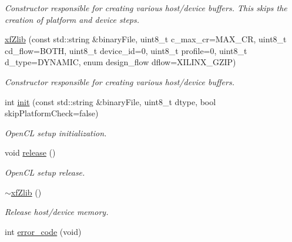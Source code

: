 \begin{DoxyCompactItemize}
\begin{DoxyCompactList}\small\item\em Constructor responsible for creating various host/device buffers. This skips the creation of platform and device steps. \end{DoxyCompactList}\item 
\hypertarget{classxf_1_1compression_1_1xfZlib_a7712b200970e31a07526a43b40661dfe}{\hyperlink{classxf_1_1compression_1_1xfZlib_a7712b200970e31a07526a43b40661dfe}{xf\-Zlib} (const std\-::string \&binary\-File, uint8\-\_\-t c\-\_\-max\-\_\-cr=M\-A\-X\-\_\-\-C\-R, uint8\-\_\-t cd\-\_\-flow=B\-O\-T\-H, uint8\-\_\-t device\-\_\-id=0, uint8\-\_\-t profile=0, uint8\-\_\-t d\-\_\-type=D\-Y\-N\-A\-M\-I\-C, enum design\-\_\-flow dflow=X\-I\-L\-I\-N\-X\-\_\-\-G\-Z\-I\-P)}\label{classxf_1_1compression_1_1xfZlib_a7712b200970e31a07526a43b40661dfe}

\begin{DoxyCompactList}\small\item\em Constructor responsible for creating various host/device buffers. \end{DoxyCompactList}\item 
int \hyperlink{classxf_1_1compression_1_1xfZlib_a50efe5b6226616a043af9044323a982a}{init} (const std\-::string \&binary\-File, uint8\-\_\-t dtype, bool skip\-Platform\-Check=false)
\begin{DoxyCompactList}\small\item\em Open\-C\-L setup initialization. \end{DoxyCompactList}\item 
\hypertarget{classxf_1_1compression_1_1xfZlib_a161a134c573011f422026e83597b96b3}{void \hyperlink{classxf_1_1compression_1_1xfZlib_a161a134c573011f422026e83597b96b3}{release} ()}\label{classxf_1_1compression_1_1xfZlib_a161a134c573011f422026e83597b96b3}

\begin{DoxyCompactList}\small\item\em Open\-C\-L setup release. \end{DoxyCompactList}\item 
\hypertarget{classxf_1_1compression_1_1xfZlib_a6904dbfc6bf5a6f9917fb727ed5e391d}{\hyperlink{classxf_1_1compression_1_1xfZlib_a6904dbfc6bf5a6f9917fb727ed5e391d}{$\sim$xf\-Zlib} ()}\label{classxf_1_1compression_1_1xfZlib_a6904dbfc6bf5a6f9917fb727ed5e391d}

\begin{DoxyCompactList}\small\item\em Release host/device memory. \end{DoxyCompactList}\item 
\hypertarget{classxf_1_1compression_1_1xfZlib_a287855eea3200b5fb64a09bce2e19f67}{int \hyperlink{classxf_1_1compression_1_1xfZlib_a287855eea3200b5fb64a09bce2e19f67}{error\-\_\-code} (void)}\label{classxf_1_1compression_1_1xfZlib_a287855eea3200b5fb64a09bce2e19f67}


\end{DoxyCompactItemize}
